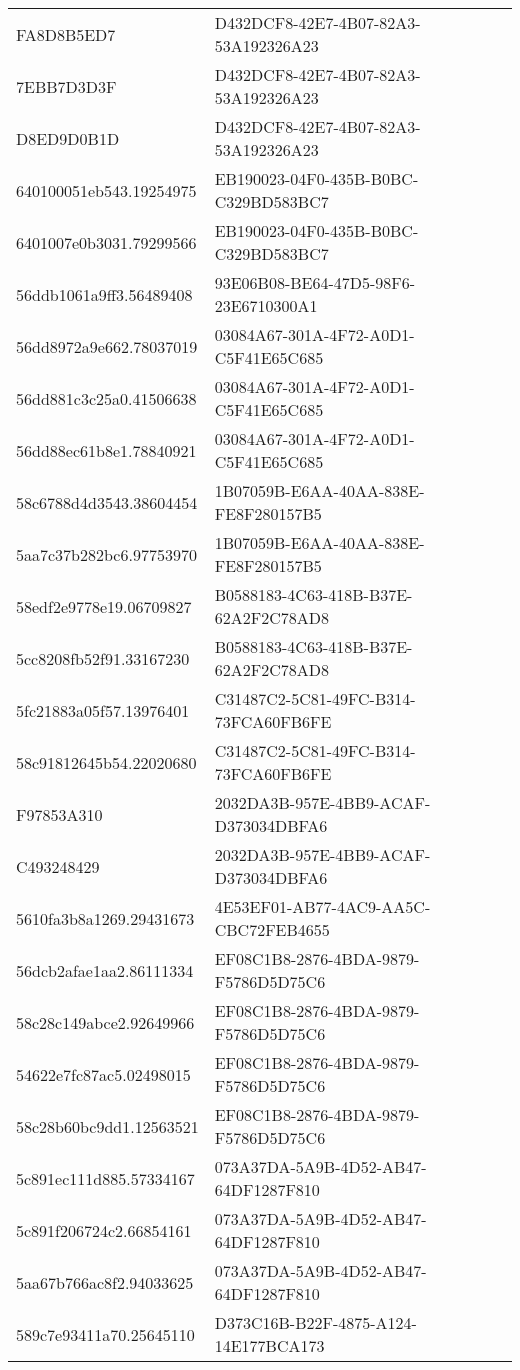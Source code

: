 \begin{tabular}{ll}
FA8D8B5ED7 & D432DCF8-42E7-4B07-82A3-53A192326A23 \\
7EBB7D3D3F & D432DCF8-42E7-4B07-82A3-53A192326A23 \\
D8ED9D0B1D & D432DCF8-42E7-4B07-82A3-53A192326A23 \\
640100051eb543.19254975 & EB190023-04F0-435B-B0BC-C329BD583BC7 \\
6401007e0b3031.79299566 & EB190023-04F0-435B-B0BC-C329BD583BC7 \\
56ddb1061a9ff3.56489408 & 93E06B08-BE64-47D5-98F6-23E6710300A1 \\
56dd8972a9e662.78037019 & 03084A67-301A-4F72-A0D1-C5F41E65C685 \\
56dd881c3c25a0.41506638 & 03084A67-301A-4F72-A0D1-C5F41E65C685 \\
56dd88ec61b8e1.78840921 & 03084A67-301A-4F72-A0D1-C5F41E65C685 \\
58c6788d4d3543.38604454 & 1B07059B-E6AA-40AA-838E-FE8F280157B5 \\
5aa7c37b282bc6.97753970 & 1B07059B-E6AA-40AA-838E-FE8F280157B5 \\
58edf2e9778e19.06709827 & B0588183-4C63-418B-B37E-62A2F2C78AD8 \\
5cc8208fb52f91.33167230 & B0588183-4C63-418B-B37E-62A2F2C78AD8 \\
5fc21883a05f57.13976401 & C31487C2-5C81-49FC-B314-73FCA60FB6FE \\
58c91812645b54.22020680 & C31487C2-5C81-49FC-B314-73FCA60FB6FE \\
F97853A310 & 2032DA3B-957E-4BB9-ACAF-D373034DBFA6 \\
C493248429 & 2032DA3B-957E-4BB9-ACAF-D373034DBFA6 \\
5610fa3b8a1269.29431673 & 4E53EF01-AB77-4AC9-AA5C-CBC72FEB4655 \\
56dcb2afae1aa2.86111334 & EF08C1B8-2876-4BDA-9879-F5786D5D75C6 \\
58c28c149abce2.92649966 & EF08C1B8-2876-4BDA-9879-F5786D5D75C6 \\
54622e7fc87ac5.02498015 & EF08C1B8-2876-4BDA-9879-F5786D5D75C6 \\
58c28b60bc9dd1.12563521 & EF08C1B8-2876-4BDA-9879-F5786D5D75C6 \\
5c891ec111d885.57334167 & 073A37DA-5A9B-4D52-AB47-64DF1287F810 \\
5c891f206724c2.66854161 & 073A37DA-5A9B-4D52-AB47-64DF1287F810 \\
5aa67b766ac8f2.94033625 & 073A37DA-5A9B-4D52-AB47-64DF1287F810 \\
589c7e93411a70.25645110 & D373C16B-B22F-4875-A124-14E177BCA173 \\

\end{tabular}
